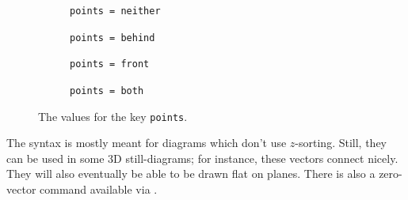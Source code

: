 \documentclass[12pt]{report}
\begin{document}
            \begin{figure}
                \centering
                \begin{subfigure}{0.3\textwidth}
                    \centering
                    \caption{\texttt{points = neither}}
                \end{subfigure}
                \begin{subfigure}{0.3\textwidth}
                    \centering
                    \caption{\texttt{points = behind}}
                \end{subfigure}\par
                \begin{subfigure}{0.3\textwidth}
                    \centering
                    \caption{\texttt{points = front}}
                \end{subfigure}
                \begin{subfigure}{0.3\textwidth}
                    \centering
                    \caption{\texttt{points = both}}
                \end{subfigure}
                \caption{The values for the key \texttt{points}.}
                \label{fig:2-1-2}
            \end{figure}
            The \texttt{\drawvector} syntax is mostly
            meant for diagrams which don't use \(z\)-sorting.
            Still, they can be used in some 3D still-diagrams;
            for instance, these vectors connect nicely.
            They will also eventually be able to be drawn flat 
            on planes. There is also a zero-vector command 
            available via \texttt{\drawpoint}.
\end{document}
